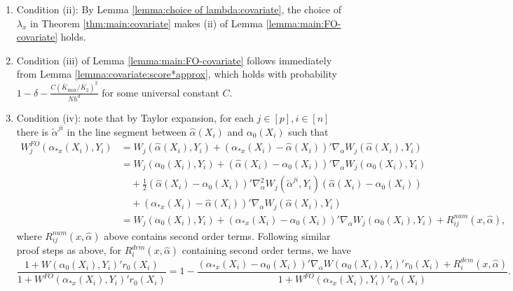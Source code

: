 \documentclass[11pt]{article}
\begin{document}
\begin{enumerate}
$$\begin{array}{rl}
&\displaystyle\quad\frac{1}{N}\sum_{i=1}^N\!K_h(X_i-x)\left\{\frac{W(\alpha_0(X_i),Y_i)'(r_0(X_i)-r_{*x}(X_i))}{1+ W(\alpha_0(X_i),Y_i)'r_0(X_i)}\right\}^2\\
&\displaystyle\leq_{(1)}C's^2\{\max_{i\in[N], j\in T_i}(r_{0j}(X_i)-r_{*xj}(X_i))^2\}\leq_{(2)}Cs^2d^2h^4,
\end{array}$$ 
where (1) holds with probability $1-\delta_{\alpha}$ by Assumption \ref{ass:smoothness-assumptions} and sparsity condition in Assumption \ref{ass:iid-min-den}, (2) holds by (\ref{eq:r_0 estimate:ell_1 error}), and $C,C'$ are universal constants. Thus the second term in (i) of Lemma \ref{lemma:main:FO-covariate} holds with $\mathcal{G}(x)=Cs^2d^2h^4$. 
\item Condition (ii): By Lemma \ref{lemma:choice of lambda:covariate}, the choice of $\lambda_x$ in Theorem \ref{thm:main:covariate} makes (ii) of Lemma \ref{lemma:main:FO-covariate} holds. 
\item Condition (iii) of Lemma \ref{lemma:main:FO-covariate} follows immediately from Lemma \ref{lemma:covariate:score*approx}, which holds with probability $1-\delta-\frac{C(\bar{K}_{\max}/\bar{K}_2)^2}{Nh^d}$ for some universal constant $C$. 
\item Condition (iv): note that by Taylor expansion, for each $j\in [p], i\in[n]$ there is $\tilde \alpha^{ji}$ in the line segment between $\hat \alpha(X_i)$ and $\alpha_0(X_i)$ such that
$$ \begin{array}{rl}
W^{FO}_j(\alpha_{*x}(X_i),Y_i) &= W_j(\hat \alpha(X_i),Y_i) + (\alpha_{*x}(X_i)-\hat\alpha(X_i))'\nabla_\alpha W_j(\hat\alpha(X_i),Y_i)\\ 
& = W_j(\alpha_{0}(X_i),Y_i)+(\hat\alpha(X_i)-\alpha_{0}(X_i))'\nabla_\alpha W_j(\alpha_{0}(X_i),Y_i)\\
&\quad\displaystyle+\frac{1}{2}(\hat\alpha(X_i)-\alpha_{0}(X_i))'\nabla_\alpha^2W_j(\tilde \alpha^{ji},Y_i)(\hat\alpha(X_i)-\alpha_{0}(X_i))\\
&\quad + (\alpha_{*x}(X_i)-\hat\alpha(X_i))'\nabla_\alpha W_j(\hat\alpha(X_i),Y_i)\\ 
& = W_j(\alpha_{0}(X_i),Y_i)+(\alpha_{*x}(X_i)-\alpha_{0}(X_i))'\nabla_\alpha W_j(\alpha_{0}(X_i),Y_i) + R_{ij}^{num}(x,\hat\alpha),
\end{array}$$
where $R_{ij}^{num}(x,\hat\alpha)$ above contains second order terms. Following similar proof steps as above, for $R_i^{dem}(x,\hat \alpha)$ containing second order terms, we have  $$\frac{1+W(\alpha_0(X_i),Y_i)'r_0(X_i)}{1+W^{FO}(\alpha_{*x}(X_i),Y_i)'r_0(X_i)}=1 - \frac{(\alpha_{*x}(X_i)-\alpha_0(X_i))'\nabla_\alpha W(\alpha_0(X_i),Y_i)'r_0(X_i)+ R_i^{dem}(x,\hat \alpha)}{1+W^{FO}(\alpha_{*x}(X_i),Y_i)'r_0(X_i)}.$$ 

\end{enumerate}
\end{document}
